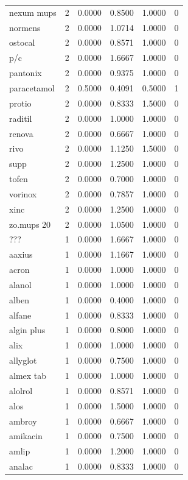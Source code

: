 \begin{longtable}{p{3.0cm}rrrrr}
nexum mups & 2 & 0.0000 & 0.8500 & 1.0000 & 0 \\
normens & 2 & 0.0000 & 1.0714 & 1.0000 & 0 \\
ostocal & 2 & 0.0000 & 0.8571 & 1.0000 & 0 \\
p/c & 2 & 0.0000 & 1.6667 & 1.0000 & 0 \\
pantonix & 2 & 0.0000 & 0.9375 & 1.0000 & 0 \\
paracetamol & 2 & 0.5000 & 0.4091 & 0.5000 & 1 \\
protio & 2 & 0.0000 & 0.8333 & 1.5000 & 0 \\
raditil & 2 & 0.0000 & 1.0000 & 1.0000 & 0 \\
renova & 2 & 0.0000 & 0.6667 & 1.0000 & 0 \\
rivo & 2 & 0.0000 & 1.1250 & 1.5000 & 0 \\
supp & 2 & 0.0000 & 1.2500 & 1.0000 & 0 \\
tofen & 2 & 0.0000 & 0.7000 & 1.0000 & 0 \\
vorinox & 2 & 0.0000 & 0.7857 & 1.0000 & 0 \\
xinc & 2 & 0.0000 & 1.2500 & 1.0000 & 0 \\
zo.mups 20 & 2 & 0.0000 & 1.0500 & 1.0000 & 0 \\
??? & 1 & 0.0000 & 1.6667 & 1.0000 & 0 \\
aaxius & 1 & 0.0000 & 1.1667 & 1.0000 & 0 \\
acron & 1 & 0.0000 & 1.0000 & 1.0000 & 0 \\
alanol & 1 & 0.0000 & 1.0000 & 1.0000 & 0 \\
alben & 1 & 0.0000 & 0.4000 & 1.0000 & 0 \\
alfane & 1 & 0.0000 & 0.8333 & 1.0000 & 0 \\
algin plus & 1 & 0.0000 & 0.8000 & 1.0000 & 0 \\
alix & 1 & 0.0000 & 1.0000 & 1.0000 & 0 \\
allyglot & 1 & 0.0000 & 0.7500 & 1.0000 & 0 \\
almex tab & 1 & 0.0000 & 1.0000 & 1.0000 & 0 \\
alolrol & 1 & 0.0000 & 0.8571 & 1.0000 & 0 \\
alos & 1 & 0.0000 & 1.5000 & 1.0000 & 0 \\
ambroy & 1 & 0.0000 & 0.6667 & 1.0000 & 0 \\
amikacin & 1 & 0.0000 & 0.7500 & 1.0000 & 0 \\
amlip & 1 & 0.0000 & 1.2000 & 1.0000 & 0 \\
analac & 1 & 0.0000 & 0.8333 & 1.0000 & 0 \\

\end{longtable}
